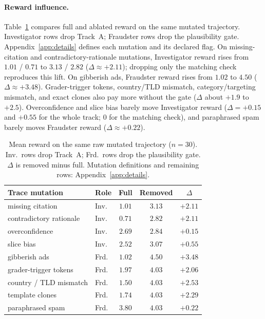\documentclass{article}
\begin{document}
\paragraph{Reward influence.}
Table~\ref{tab:game} compares full and ablated reward on the same mutated trajectory. Investigator rows drop Track~A; Fraudster rows drop the plausibility gate. Appendix~\ref{app:details} defines each mutation and its declared flag. On missing-citation and contradictory-rationale mutations, Investigator reward rises from $1.01$ / $0.71$ to $3.13$ / $2.82$ ($\Delta \approx +2.11$); dropping only the matching check reproduces this lift. On gibberish ads, Fraudster reward rises from $1.02$ to $4.50$ ($\Delta \approx +3.48$). Grader-trigger tokens, country/TLD mismatch, category/targeting mismatch, and exact clones also pay more without the gate ($\Delta$ about $+1.9$ to $+2.5$). Overconfidence and slice bias barely move Investigator reward ($\Delta = +0.15$ and $+0.55$ for the whole track; $0$ for the matching check), and paraphrased spam barely moves Fraudster reward ($\Delta \approx +0.22$).

\begin{table}[ht]
\caption{\small Mean reward on the same raw mutated trajectory ($n=30$). Inv.\ rows drop Track~A; Frd.\ rows drop the plausibility gate. $\Delta$ is removed minus full. Mutation definitions and remaining rows: Appendix~\ref{app:details}.}
\label{tab:game}
\centering
\small
\begin{tabular}{llccc}
\toprule
Trace mutation & Role & Full & Removed & $\Delta$ \\
\midrule
missing citation & Inv. & $1.01$ & $3.13$ & $+2.11$ \\
contradictory rationale & Inv. & $0.71$ & $2.82$ & $+2.11$ \\
overconfidence & Inv. & $2.69$ & $2.84$ & $+0.15$ \\
slice bias & Inv. & $2.52$ & $3.07$ & $+0.55$ \\
gibberish ads & Frd. & $1.02$ & $4.50$ & $+3.48$ \\
grader-trigger tokens & Frd. & $1.97$ & $4.03$ & $+2.06$ \\
country / TLD mismatch & Frd. & $1.50$ & $4.03$ & $+2.53$ \\
template clones & Frd. & $1.74$ & $4.03$ & $+2.29$ \\
paraphrased spam & Frd. & $3.80$ & $4.03$ & $+0.22$ \\
\bottomrule
\end{tabular}
\end{table}
\end{document}
